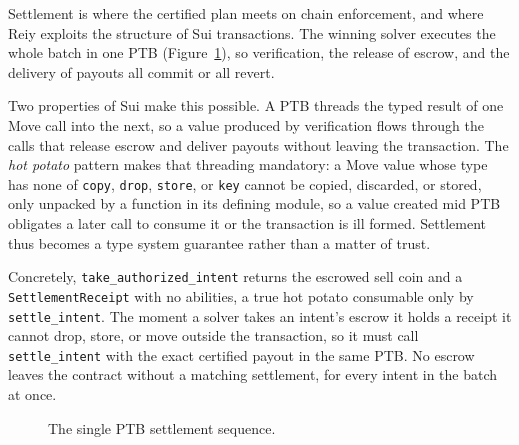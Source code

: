 \documentclass[10pt,sigconf,nonacm]{acmart}
\theoremstyle{reiythm}
\begin{document}
\noindent Settlement is where the certified plan meets on chain enforcement, and
where Reiy exploits the structure of Sui transactions. The winning solver executes
the whole batch in one PTB (Figure~\ref{fig:settle}), so verification, the release
of escrow, and the delivery of payouts all commit or all revert.

Two properties of Sui make this possible. A PTB threads the typed result of one
Move call into the next, so a value produced by verification flows through the calls
that release escrow and deliver payouts without leaving the transaction. The
\emph{hot potato} pattern makes that threading mandatory: a Move value whose type
has none of \texttt{copy}, \texttt{drop}, \texttt{store}, or \texttt{key} cannot be
copied, discarded, or stored, only unpacked by a function in its defining module, so
a value created mid PTB obligates a later call to consume it or the transaction is
ill formed. Settlement thus becomes a type system guarantee rather than a matter of
trust.

Concretely, \texttt{take\_authorized\_intent} returns the escrowed sell coin and a
\texttt{SettlementReceipt} with no abilities, a true hot potato consumable only by
\texttt{settle\_intent}. The moment a solver takes an intent's escrow it holds a
receipt it cannot drop, store, or move outside the transaction, so it must call
\texttt{settle\_intent} with the exact certified payout in the same PTB. No escrow
leaves the contract without a matching settlement, for every intent in the batch at
once.

\begin{figure}[htbp]
  \centering
  \caption{The single PTB settlement sequence.}
  \label{fig:settle}
\end{figure}
\end{document}
